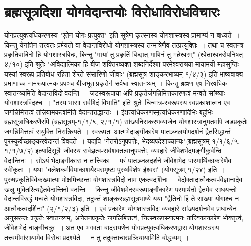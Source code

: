 {\section*{ब्रह्मसूत्रदिशा योगवेदान्तयोः विरोधाविरोधविचारः}

योगप्रत्युक्त्यधिकरणस्य "एतेन योगः प्रत्युक्त" इति सूत्रेण कृत्स्नस्य योगशास्त्रस्य प्रामाण्यं न बाध्यते~। किन्तु येनांशेन तत्त्वतः प्रमेयतो वा वेदान्तविरोधो योगशास्त्रस्य तन्मात्रेणैव तत्प्रत्युक्तिः~। तथा च स्वतन्त्र-प्रकृतिवादिनो हि योगशास्त्रविदः, किन्तु "मायां तु प्रकृतिं विद्यात् मायिनं तु महेश्वरम्" (श्वेताश्वतरोपनिषत् ४/१०) इति श्रुतेः "अविद्यात्मिका हि बीज-शक्तिरव्यक्त-शब्दनिर्देश्या परमेश्वराश्रया मायामयी महासुप्तिः यस्यां स्वरूप-प्रतिबोध-रहिता शेरते संसारिणो जीवाः" (ब्रह्मसूत्र-शाङ्करभाष्यम् १/४/३) इति भाष्यवाक्य-प्रमाणाच्च नाम\-रूपात्मक-प्रपञ्च-बीजभूत-प्रकृतेर्न सर्वथा स्वातन्त्र्यम्~। किन्तु ब्रह्मण एव निरवधिक-स्वा\-तन्त्र्यमिति वेदान्तविदो वदन्ति~। जडस्वरूपाया अपि प्रकृतेर्जगन्निमित्तकारणत्वं मन्वते सांख्याः योगशास्त्रविदश्च~। "तस्य भासा सर्वमिदं विभाति" इति श्रुतेः चिन्मात्र-स्वरूपस्य स्वप्रकाशात्मन एव जगन्निमित्तत्वं तन्नियामकत्वमिति वेदान्तराद्धान्तः~। ईक्षत्यधिकरणस्मृत्यधिकरणादिभिः बहुभिः ब्रह्मसूत्राधिकरणैरपि (ब्रह्मसूत्रम्-१/१/५, २/१/१) सांख्यनिराकरणव्याजेन योगशास्त्रानुमतमपि जडप्रकृतेः जगन्निमित्तत्वं सयुक्ति निराक्रियते~। स्वरूपतः आत्मभेदाङ्गीकारेण पातञ्जलयोगदर्शनं द्वैतसिद्धान्तं पुरस्कुर्वच्छाङ्करवेदान्तं विवदते~। यद्यपि "नेतरोऽनुपपत्तेः, भेदव्यपदेशाच्चान्यः"(ब्रह्मसूत्रम् १/१/६/५, १/१/७/२) इत्यादिसूत्रैः जीवस्य सर्वज्ञत्व-सर्वशक्तत्वानुपपत्तेः, व्यवहारे जीवेशभेदमङ्गीकुर्वन्ति वेदान्तिनः~। सोऽयं भेदाङ्गीकारः न तात्त्विकः~। परं पातञ्जलदर्शने जीवेशभेदः पारमार्थिकाकारेणैव स्वीकृतः~। यथा "क्लेशकर्मविपाकाशयैरपरामृष्टः पुरुषविशेष ईश्वरः" (योगसूत्रम् १/२४) इति~। पुरुषप्रकृतिविवेकख्यात्या मोक्षमिच्छन्तः योगशास्त्रविदो नाम एकत्वदर्शिनः~। वेदोक्तादात्मैकत्व-विज्ञानादेव खलु मुक्तिरित्यद्वैतवेदान्तिनो वदन्ति~। किन्तु जीवेशभेदस्वरूपाङ्गीकारेण परमार्थतो द्वैतमेव साधयन्तो वेदान्तविरुद्धं मन्वते योगशास्त्रविदः, तदुक्तं शाङ्करब्रह्मसूत्रभाष्ये यथा "द्वैतिनो हि ते सांख्या योगाश्च न आत्मैकत्वदर्शिनः" (२/१/२/३) इति~। एवं प्रकारेण योगशास्त्रविदः व्यवहारे सांख्यदर्शनमेव प्राधान्येन अनुसरन्तः प्रकृतेः स्वातन्त्र्यम्, अचेतनप्रकृतेः जगन्निमित्तत्वं, चित्स्वरूपस्यात्मनः तात्त्विकाकारेण भोक्तृत्वं, जीवेशभेदं चाङ्गीचक्रुः~। अत एव भगवता बादरायणेन योगप्रत्युक्त्यधिकरणद्वारा योगशास्त्रस्य तत्त्वमीमांसायामेव विरोधः प्रदर्श्यते~। न तु तदुक्ताचारप्रक्रियायामिति बोद्धव्यम्~। 

}
